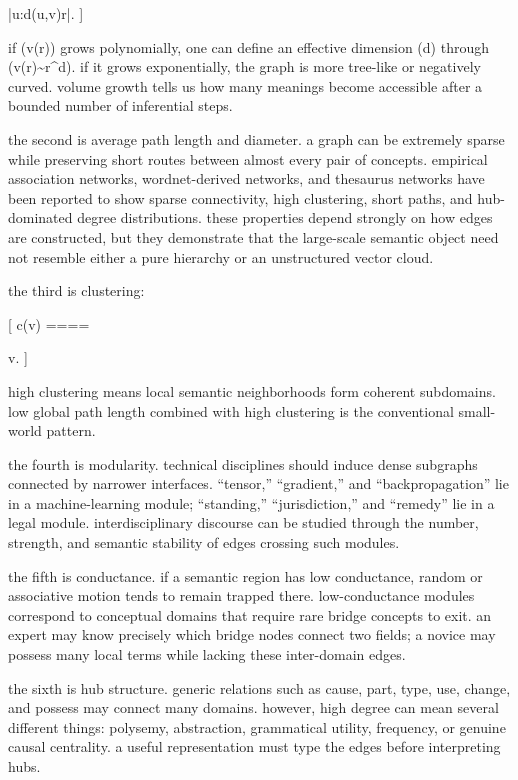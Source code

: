 |{u:d(u,v)\le r}|.
]

if (v(r)) grows polynomially, one can define an effective dimension (d) through (v(r)\sim r^d). if it grows exponentially, the graph is more tree-like or negatively curved. volume growth tells us how many meanings become accessible after a bounded number of inferential steps.

the second is average path length and diameter. a graph can be extremely sparse while preserving short routes between almost every pair of concepts. empirical association networks, wordnet-derived networks, and thesaurus networks have been reported to show sparse connectivity, high clustering, short paths, and hub-dominated degree distributions. these properties depend strongly on how edges are constructed, but they demonstrate that the large-scale semantic object need not resemble either a pure hierarchy or an unstructured vector cloud.

the third is clustering:

[
c(v)
====

{v}.
]

high clustering means local semantic neighborhoods form coherent subdomains. low global path length combined with high clustering is the conventional small-world pattern.

the fourth is modularity. technical disciplines should induce dense subgraphs connected by narrower interfaces. “tensor,” “gradient,” and “backpropagation” lie in a machine-learning module; “standing,” “jurisdiction,” and “remedy” lie in a legal module. interdisciplinary discourse can be studied through the number, strength, and semantic stability of edges crossing such modules.

the fifth is conductance. if a semantic region has low conductance, random or associative motion tends to remain trapped there. low-conductance modules correspond to conceptual domains that require rare bridge concepts to exit. an expert may know precisely which bridge nodes connect two fields; a novice may possess many local terms while lacking these inter-domain edges.

the sixth is hub structure. generic relations such as cause, part, type, use, change, and possess may connect many domains. however, high degree can mean several different things: polysemy, abstraction, grammatical utility, frequency, or genuine causal centrality. a useful representation must type the edges before interpreting hubs.

